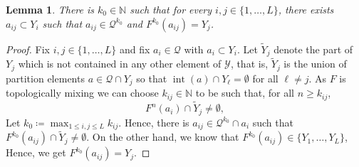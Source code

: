 \documentclass[english, 10pt]{amsart}
\numberwithin{equation}{section}
\theoremstyle{definition}
\theoremstyle{plain}
\newtheorem{lemma}[definition]{Lemma}
\theoremstyle{plain}
\theoremstyle{definition}
\theoremstyle{definition}
\theoremstyle{plain}
\theoremstyle{definition}
\newcommand{\cY}{{\mathcal Y}}
\newcommand{\cQ}{{\mathcal Q}}
\newcommand{\N}{{\mathbb N}}
\newcommand{\eqdef}{\coloneqq}
\newcommand{\bN}{\N}
\newcommand{\intr}{\operatorname{int}}
\numberwithin{equation}{section}
\begin{document}
\begin{lemma}\label{lem:k0}
  There is $k_0 \in\bN$ such that for every $i,j\in\{1,\ldots,L\}$,
  there exists $a_{ij}\subset Y_i$ such that $a_{ij}\in\cQ^{k_0}$ and $F^{k_0}(a_{ij})=Y_j$.
\end{lemma}

\begin{proof}
  Fix $i,j \in\{ 1, \ldots , L \}$ and fix $a_i \in \cQ$ with $a_i \subset Y_i$.
  Let $\widetilde Y_j$ denote the part of $Y_j$ which is not contained in any other element of $\cY$, that is,
  $\widetilde Y_j$ is the union of partition elements $a \in \cQ \cap Y_{j}$ so that $\intr (a) \cap Y_{\ell} = \emptyset$ for all $\ell \neq j$.
  As $F$ is topologically mixing we can choose $k_{ij} \in \N$ to be such that,
  for all $n \ge k_{ij}$,
  \[
    F^n(a_i)\cap \widetilde Y_j \ne \emptyset,
  \]
  Let $k_0 \eqdef \max_{1 \le i,j \le L } k_{ij}$. Hence, there is $a_{ij} \in \cQ^{k_0} \cap a_i$ such that $F^{k_0}( a_{ij}) \cap \widetilde Y_j \neq \emptyset$. On the other hand, we know that $F^{k_0}( a_{ij}) \in \{ Y_1, \ldots , Y_L \}$, Hence,  we get $F^{k_0}(a_{ij}) = Y_j$.
\end{proof}
\end{document}
